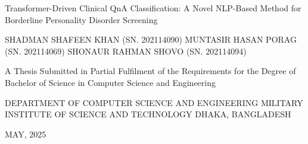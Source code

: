 \documentclass[12pt]{report}
\begin{document}
\hypersetup{citecolor=black,pageanchor=false}
\begin{singlespace}
\begingroup
\begin{center}
\fontsize{18pt}{18pt}\selectfont
Transformer-Driven Clinical QnA Classification: A Novel NLP-Based Method for Borderline Personality Disorder Screening

\end{center}



\vspace{\dimexpr23.25mm-\baselineskip}
\centering
\fontsize{16pt}{16pt}\selectfont
SHADMAN SHAFEEN KHAN (SN. 202114090)\linebreak 
MUNTASIR HASAN PORAG (SN. 202114069)\linebreak
SHONAUR RAHMAN SHOVO (SN. 202114094)\linebreak




\vspace{\dimexpr25.08mm-\baselineskip}
\centering 
\fontsize{16pt}{16pt}\selectfont
A Thesis Submitted in Partial Fulfilment of the Requirements for the
Degree of Bachelor of Science in Computer Science and Engineering\linebreak
\vspace{\dimexpr25mm-\baselineskip}



\centering


\vspace{\dimexpr8mm-\baselineskip}

\thispagestyle{empty}
\centering
\fontsize{16pt}{16pt}\selectfont
DEPARTMENT OF COMPUTER SCIENCE AND ENGINEERING\linebreak
MILITARY INSTITUTE OF SCIENCE AND TECHNOLOGY\linebreak
DHAKA, BANGLADESH
 
\centering
\fontsize{16pt}{16pt}\selectfont
\par\bigskip
MAY, 2025
 \par
\endgroup



\end{singlespace}




\thesiscertificationpage
\thispagestyle{empty}
\newpage
\thispagestyle{empty}
\thesiscandidatesdeclaration
\thispagestyle{empty}
\newpage
{}
\hypersetup{pageanchor=true}
\setcounter{page}{1}

\newpage %

\newpage

\end{document}
